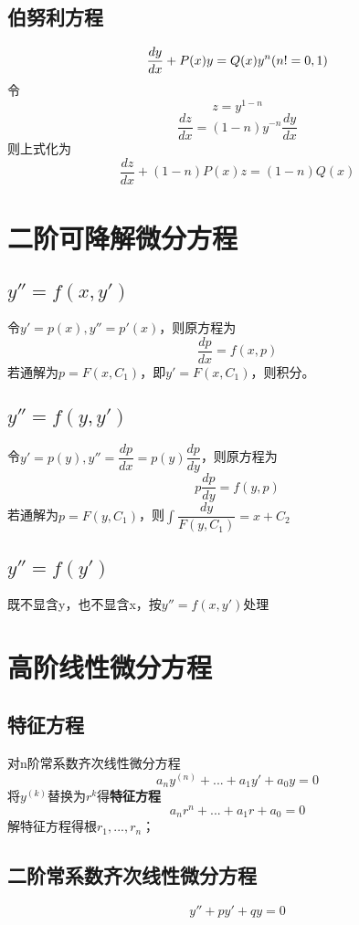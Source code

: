 \subsection{伯努利方程}
\[\dfrac{dy}{dx} + P(x)y = Q(x)y^{n}\space (n != 0, 1)\]
令\[z = y^{1 - n}\]
\[\dfrac{dz}{dx} = (1 - n)y^{-n}\dfrac{dy}{dx}\]
则上式化为\[\dfrac{dz}{dx} + (1 - n)P(x)z = (1 - n)Q(x)\]


\section{二阶可降解微分方程}

\subsection{\(y'' = f(x, y')\)}

令\(y' = p(x), y'' = p'(x)\)，则原方程为\[\dfrac{dp}{dx} = f(x, p)\]
若通解为\(p = F(x, C_1)\)，即\(y' = F(x, C_1)\)，则积分。


\subsection{\(y'' = f(y, y')\)}

令\(y' = p(y), y'' = \dfrac{dp}{dx} = p(y)\dfrac{dp}{dy}\)，则原方程为\[p\dfrac{dp}{dy} = f(y, p)\]
若通解为\(p = F(y, C_1)\)，则\(\int\dfrac{dy}{F(y, C_1)} = x + C_2\)

\subsection{\(y'' = f(y')\)}

既不显含y，也不显含x，按\(y'' = f(x, y')\)处理


\section{高阶线性微分方程}

\subsection{特征方程}
对n阶常系数齐次线性微分方程\[a_ny^{(n)} + ... + a_1y' + a_0y = 0\]
将\(y^{(k)}\)替换为\(r^k\)得\textbf{特征方程}\[a_nr^n + ... + a_1r + a_0 = 0\]
解特征方程得根\(r_1, ..., r_n\)；


\subsection{二阶常系数齐次线性微分方程}
\[y'' + py' + qy = 0\]

